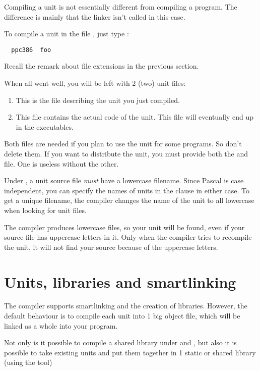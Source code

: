 \documentclass{book}
\begin{document}
Compiling a unit is not essentially different from compiling a program.
The difference is mainly that the linker isn't called in this case.

To compile a unit in the file , just type :
\begin{verbatim}
  ppc386  foo
\end{verbatim}
Recall the remark about file extensions in the previous section.

When all went well, you will be left with 2 (two) unit files:
\begin{enumerate}
\item {} This is the file describing the unit you just
compiled.
\item {} This file contains the actual code of the unit.
This file will eventually end up in the executables.
\end{enumerate}
Both files are needed if you plan to use the unit for some programs.
So don't delete them. If you want to distribute the unit, you must
provide both the  and  file. One is useless without the
other.

\begin{remark}
Under \linux, a unit source file {\em must} have a lowercase filename.
Since Pascal is case independent, you can specify the names of units in the
 clause in either case. To get a unique filename, the \fpc compiler
changes the name of the unit to all lowercase when looking for unit files.
\end{remark}
The compiler produces lowercase files, so your unit will be found, even if
your source file has uppercase letters in it. Only when the compiler tries to
recompile the unit, it will not find your source because of the uppercase
letters.

\section{Units, libraries and smartlinking}
The \fpc compiler supports smartlinking and the creation of libraries.
However, the default behaviour is to compile each unit into 1 big object
file, which will be linked as a whole into your program.

Not only is it possible to compile a shared library under \windows and
\linux, but also it is possible to take existing units and put them
together in 1 static or shared library (using the  tool)
\end{document}
